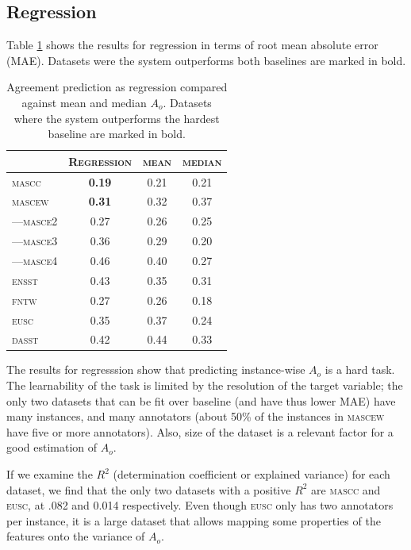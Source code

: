 \documentclass[11pt,a4paper]{article}
\begin{document}
\subsection{Regression}
\label{sec:reg}
Table \ref{tab:regagr_results} shows the results for regression in terms of root mean absolute error (MAE). Datasets were the system outperforms both baselines are marked in bold.


\begin{table}[Ht!]

\begin{center}
  \begin{tabular}{lc|cc}
 \toprule
 & \textsc{Regression} & \textsc{mean} & \textsc{median} \\
 \midrule
 \textsc{mascc} & \textbf{0.19} & 0.21 & 0.21 \\
 \textsc{mascew} & \textbf{0.31} & 0.32 & 0.37 \\
---\textsc{masce2} & {0.27} & 0.26 & 0.25 \\
---\textsc{masce3} & {0.36} & 0.29 & 0.20 \\
---\textsc{masce4} & {0.46} & 0.40 & 0.27 \\
\textsc{ensst} & {0.43} & 0.35 & 0.31 \\
\textsc{fntw} & {0.27} & 0.26 & 0.18 \\

\textsc{eusc} & 0.35 & 0.37 & 0.24 \\
\textsc{dasst} & 0.42 & 0.44 & 0.33 \\

\bottomrule

  \end{tabular}  
\end{center}
\caption{Agreement prediction as regression compared against mean and median $A_o$. Datasets where the system outperforms the hardest baseline are marked in bold. \label{tab:regagr_results}}
\end{table} 

The results for regresssion show that predicting instance-wise $A_o$ is a hard task. The learnability of the task is limited by the resolution of the target variable; the only two datasets that can be fit over baseline (and have thus lower MAE) have many instances, and many annotators (about 50\% of the instances in \textsc{mascew} have five or more annotators). Also, size of the dataset is a relevant factor for a good estimation of $A_o$.

If we examine the $R^2$ (determination coefficient or explained variance) for each dataset, we find that the only two datasets with a positive $R^2$ are \textsc{mascc} and \textsc{eusc}, at .082 and 0.014 respectively. Even though \textsc{eusc} only has two annotators per instance, it is a large dataset that allows mapping some properties of the features onto the variance of $A_o$.
\end{document}

